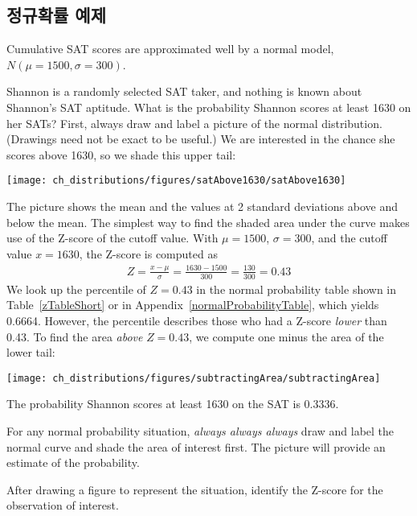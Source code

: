 \subsection{정규확률 예제}



Cumulative SAT scores are approximated well by a normal model, $N(\mu=1500, \sigma=300)$.

\begin{example}{Shannon is a randomly selected SAT taker, and nothing is known about Shannon's SAT aptitude. What is the probability Shannon scores at least 1630 on her SATs?}\label{satAbove1630Exam}
First, always draw and label a picture of the normal distribution. (Drawings need not be exact to be useful.) We are interested in the chance she scores above 1630, so we shade this upper tail:
\begin{center}
\texttt{[image: ch\_distributions/figures/satAbove1630/satAbove1630]}
\end{center}
The picture shows the mean and the values at 2 standard deviations above and below the mean. The simplest way to find the shaded area under the curve makes use of the Z-score of the cutoff value. With $\mu=1500$, $\sigma=300$, and the cutoff value $x=1630$, the Z-score is computed as
\begin{eqnarray*}
Z = \frac{x - \mu}{\sigma} = \frac{1630 - 1500}{300} = \frac{130}{300} = 0.43
\end{eqnarray*}
We look up the percentile of $Z=0.43$ in the normal probability table shown in Table~\ref{zTableShort} or in Appendix~\vref{normalProbabilityTable}, which yields 0.6664. However, the percentile describes those who had a Z-score \emph{lower} than 0.43. To find the area \emph{above} $Z=0.43$, we compute one minus the area of the lower tail:
\begin{center}
\texttt{[image: ch\_distributions/figures/subtractingArea/subtractingArea]}
\end{center}
The probability Shannon scores at least 1630 on the SAT is 0.3336.
\end{example}

\begin{tipBox}{
For any normal probability situation, \emph{always always always} draw and label the normal curve and shade the area of interest first. The picture will provide an estimate of the probability. \vspace{3mm}

After drawing a figure to represent the situation, identify the Z-score for the observation of interest.\vspace{1mm}}
\end{tipBox}

